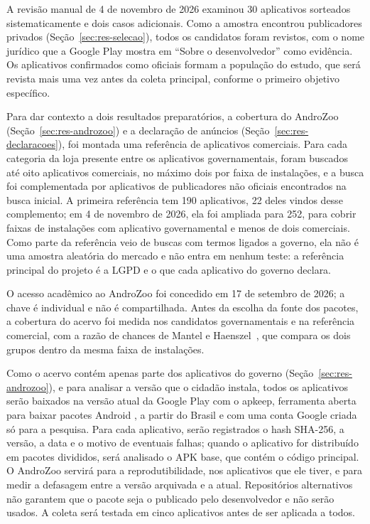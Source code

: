 A revisão manual de 4 de novembro de 2026 examinou 30 aplicativos sorteados sistematicamente e dois casos adicionais. Como a amostra encontrou publicadores privados (Seção~\ref{sec:res-selecao}), todos os candidatos foram revistos, com o nome jurídico que a Google Play mostra em ``Sobre o desenvolvedor'' como evidência. Os aplicativos confirmados como oficiais formam a população do estudo, que será revista mais uma vez antes da coleta principal, conforme o primeiro objetivo específico.

Para dar contexto a dois resultados preparatórios, a cobertura do AndroZoo (Seção~\ref{sec:res-androzoo}) e a declaração de anúncios (Seção~\ref{sec:res-declaracoes}), foi montada uma referência de aplicativos comerciais. Para cada categoria da loja presente entre os aplicativos governamentais, foram buscados até oito aplicativos comerciais, no máximo dois por faixa de instalações, e a busca foi complementada por aplicativos de publicadores não oficiais encontrados na busca inicial. A primeira referência tem 190 aplicativos, 22 deles vindos desse complemento; em 4 de novembro de 2026, ela foi ampliada para 252, para cobrir faixas de instalações com aplicativo governamental e menos de dois comerciais. Como parte da referência veio de buscas com termos ligados a governo, ela não é uma amostra aleatória do mercado e não entra em nenhum teste: a referência principal do projeto é a LGPD e o que cada aplicativo do governo declara.

\label{sec:pacotes}

O acesso acadêmico ao AndroZoo foi concedido em 17 de setembro de 2026; a chave é individual e não é compartilhada. Antes da escolha da fonte dos pacotes, a cobertura do acervo foi medida nos candidatos governamentais e na referência comercial, com a razão de chances de Mantel e Haenszel~\cite{mantel1959}, que compara os dois grupos dentro da mesma faixa de instalações.

Como o acervo contém apenas parte dos aplicativos do governo (Seção~\ref{sec:res-androzoo}), e para analisar a versão que o cidadão instala, todos os aplicativos serão baixados na versão atual da Google Play com o apkeep, ferramenta aberta para baixar pacotes Android \cite{apkeep2026}, a partir do Brasil e com uma conta Google criada só para a pesquisa. Para cada aplicativo, serão registrados o hash SHA-256, a versão, a data e o motivo de eventuais falhas; quando o aplicativo for distribuído em pacotes divididos, será analisado o APK base, que contém o código principal. O AndroZoo servirá para a reprodutibilidade, nos aplicativos que ele tiver, e para medir a defasagem entre a versão arquivada e a atual. Repositórios alternativos não garantem que o pacote seja o publicado pelo desenvolvedor e não serão usados. A coleta será testada em cinco aplicativos antes de ser aplicada a todos.

